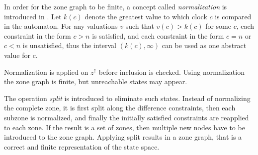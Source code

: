 In order for the zone graph to be finite, a concept called \emph{normalization} is introduced in \cite{bengtsson2004timed}.
Let $k(c)$ denote the greatest value to which clock $c$ is compared in the automaton.
For any valuations $v$ such that $v(c)>k(c)$ for some $c$, each constraint in the form $c > n$ is satisfied, and each constraint in the form $c = n$ or $c < n$ is unsatisfied, thus the interval $(k(c),\infty)$ can be used as one abstract value for $c$. 

Normalization is applied on $z^\uparrow$ before inclusion is checked.
Using normalization the zone 
graph is finite, but unreachable states may appear. 


The operation \emph{split} \cite{bengtsson2004timed} is introduced to eliminate such states. Instead of
normalizing the complete zone, it is first split along the difference constraints,
then each subzone is normalized, and finally the initially satisfied constraints are reapplied to each zone. If the result is a set of zones, then multiple new nodes have to be introduced to the zone graph. Applying split results in a zone
graph, that is a correct and finite representation of the state space.





